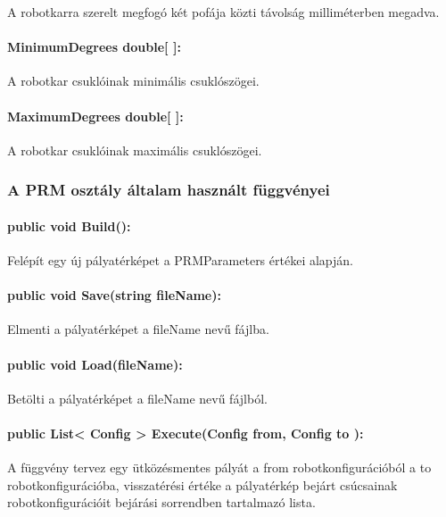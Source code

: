 A robotkarra szerelt megfogó két pofája közti távolság milliméterben megadva.

\paragraph{MinimumDegrees double[ ]:} 

A robotkar csuklóinak minimális csuklószögei.

\paragraph{MaximumDegrees double[ ]:} 

A robotkar csuklóinak maximális csuklószögei. 

\subsubsection*{A PRM osztály általam használt függvényei}

\paragraph{public void Build():}

Felépít egy új pályatérképet a PRMParameters értékei alapján.

\paragraph{public void Save(string fileName):}

Elmenti a pályatérképet a fileName nevű fájlba.

\paragraph{public void Load(fileName):}

Betölti a pályatérképet a fileName nevű fájlból.

\paragraph{public List< Config > Execute(Config from, Config to ): }

A függvény tervez egy ütközésmentes pályát a from robotkonfigurációból a to robotkonfigurációba, visszatérési értéke a pályatérkép bejárt csúcsainak robotkonfigurációit bejárási sorrendben tartalmazó lista.




